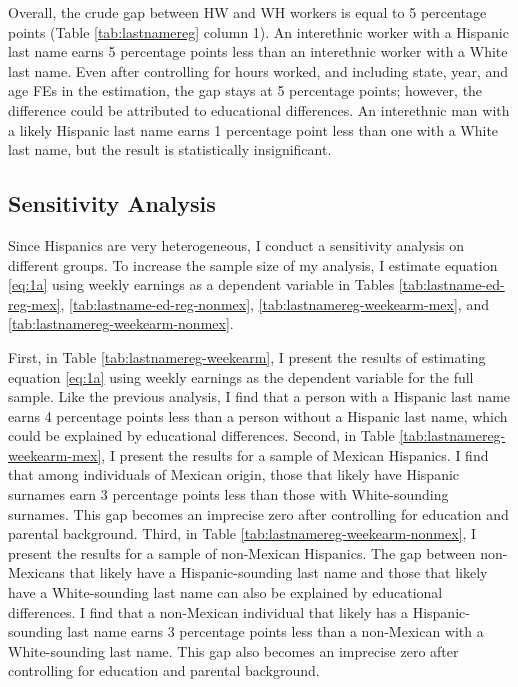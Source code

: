Overall, the crude gap between HW and WH workers is equal to 5 percentage points (Table \ref{tab:lastnamereg} column 1). An interethnic worker with a Hispanic last name earns 5 percentage points less than an interethnic worker with a White last name. Even after controlling for hours worked, and including state, year, and age FEs in the estimation, the gap stays at 5 percentage points; however, the difference could be attributed to educational differences. An interethnic man with a likely Hispanic last name earns 1 percentage point less than one with a White last name, but the result is statistically insignificant.


\subsection{Sensitivity Analysis}

Since Hispanics are very heterogeneous, I conduct a sensitivity analysis on different groups. To increase the sample size of my analysis, I estimate equation \ref{eq:1a} using weekly earnings as a dependent variable in Tables \ref{tab:lastname-ed-reg-mex}, \ref{tab:lastname-ed-reg-nonmex}, \ref{tab:lastnamereg-weekearm-mex}, and \ref{tab:lastnamereg-weekearm-nonmex}. 

First, in Table \ref{tab:lastnamereg-weekearm}, I present the results of estimating equation \ref{eq:1a} using weekly earnings as the dependent variable for the full sample. Like the previous analysis, I find that a person with a Hispanic last name earns 4 percentage points less than a person without a Hispanic last name, which could be explained by educational differences. Second, in Table \ref{tab:lastnamereg-weekearm-mex}, I present the results for a sample of Mexican Hispanics. I find that among individuals of Mexican origin, those that likely have Hispanic surnames earn 3 percentage points less than those with White-sounding surnames. This gap becomes an imprecise zero after controlling for education and parental background. Third, in Table \ref{tab:lastnamereg-weekearm-nonmex}, I present the results for a sample of non-Mexican Hispanics. The gap between non-Mexicans that likely have a Hispanic-sounding last name and those that likely have a White-sounding last name can also be explained by educational differences. I find that a non-Mexican individual that likely has a Hispanic-sounding last name earns 3 percentage points less than a non-Mexican with a White-sounding last name. This gap also becomes an imprecise zero after controlling for education and parental background.

